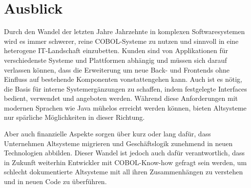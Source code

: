 \section{Ausblick}

Durch den Wandel der letzten Jahre \bzw Jahrzehnte in komplexen Softwaresystemen wird es immer schwerer, reine COBOL-Systeme zu nutzen und sinnvoll in eine heterogene IT-Landschaft einzubetten. Kunden sind von Applikationen für verschiedenste Systeme und Plattformen abhängig und müssen sich darauf verlassen können, dass die Erweiterung um neue Back- und Frontends ohne Einfluss auf bestehende Komponenten vonstattengehen kann. Auch ist es nötig, die Basis für interne Systemergänzungen zu schaffen, indem festgelegte Interfaces bedient, verwendet und angeboten werden. Während diese Anforderungen mit modernen Sprachen wie Java mühelos erreicht werden können, bieten Altsysteme nur spärliche Möglichkeiten in dieser Richtung.

Aber auch finanzielle Aspekte sorgen über kurz oder lang dafür, dass Unternehmen Altsysteme migrieren und Geschäftslogik zunehmend in neuen Technologien abbilden. Dieser Wandel ist jedoch auch dafür verantwortlich, dass in Zukunft weiterhin Entwickler mit COBOL-Know-how gefragt sein werden, um schlecht dokumentierte Altsysteme mit all ihren Zusammenhängen zu verstehen und in neuen Code zu überführen.
